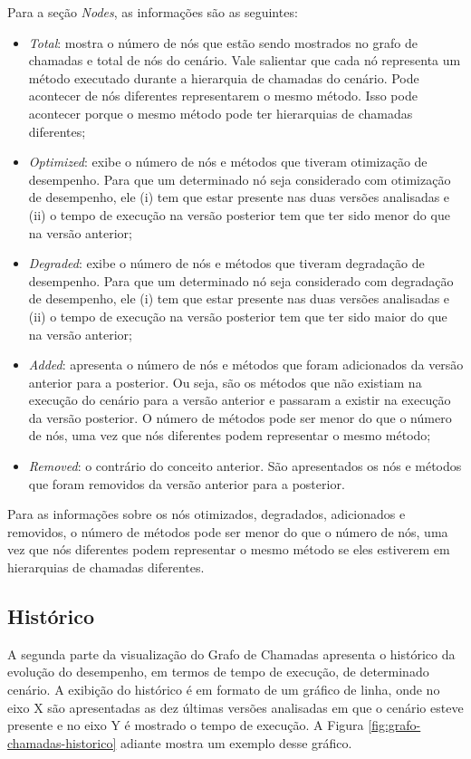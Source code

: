 Para a seção \textit{Nodes}, as informações são as seguintes:
\begin{itemize}
   \item \textit{Total}: mostra o número de nós que estão sendo mostrados no grafo de chamadas e total de nós do cenário. Vale salientar que cada nó representa um método executado durante a hierarquia de chamadas do cenário. Pode acontecer de nós diferentes representarem o mesmo método. Isso pode acontecer porque o mesmo método pode ter hierarquias de chamadas diferentes;
   \item \textit{Optimized}: exibe o número de nós e métodos que tiveram otimização de desempenho. Para que um determinado nó seja considerado com otimização de desempenho, ele (i) tem que estar presente nas duas versões analisadas e (ii) o tempo de execução na versão posterior tem que ter sido menor do que na versão anterior;
   \item \textit{Degraded}: exibe o número de nós e métodos que tiveram degradação de desempenho. Para que um determinado nó seja considerado com degradação de desempenho, ele (i) tem que estar presente nas duas versões analisadas e (ii) o tempo de execução na versão posterior tem que ter sido maior do que na versão anterior;
   \item \textit{Added}: apresenta o número de nós e métodos que foram adicionados da versão anterior para a posterior. Ou seja, são os métodos que não existiam na execução do cenário para a versão anterior e passaram a existir na execução da versão posterior. O número de métodos pode ser menor do que o número de nós, uma vez que nós diferentes podem representar o mesmo método;
   \item \textit{Removed}: o contrário do conceito anterior. São apresentados os nós e métodos que foram removidos da versão anterior para a posterior.
\end{itemize}

Para as informações sobre os nós otimizados, degradados, adicionados e removidos, o número de métodos pode ser menor do que o número de nós, uma vez que nós diferentes podem representar o mesmo método se eles estiverem em hierarquias de chamadas diferentes.

\subsection{Histórico} \label{subsubsec:visualizacao2-historico}

A segunda parte da visualização do Grafo de Chamadas apresenta o histórico da evolução do desempenho, em termos de tempo de execução, de determinado cenário. A exibição do histórico é em formato de um gráfico de linha, onde no eixo X são apresentadas as dez últimas versões analisadas em que o cenário esteve presente e no eixo Y é mostrado o tempo de execução. A Figura \ref{fig:grafo-chamadas-historico} adiante mostra um exemplo desse gráfico.

